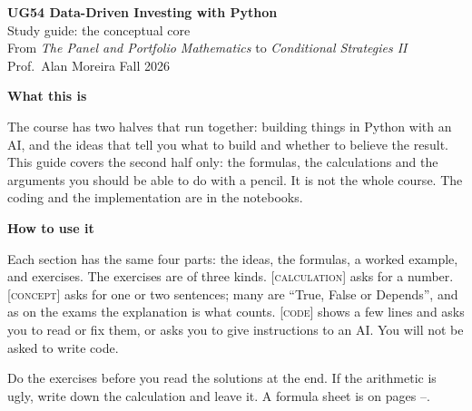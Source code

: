 \documentclass[11pt]{article}
\newcounter{ex}[section]
\newcommand{\head}[1]{\par\medskip\textbf{#1}\par}
\begin{document}
\begin{center}
{\LARGE\bfseries UG54 Data-Driven Investing with Python}\\[4pt]
{\Large Study guide: the conceptual core}\\[4pt]
{\normalsize From \emph{The Panel and Portfolio Mathematics} to \emph{Conditional Strategies II}}\\[2pt]
{\small Prof.\ Alan Moreira \quad Fall 2026}
\end{center}

\head{What this is}
The course has two halves that run together: building things in Python with an AI, and the ideas that tell you what to
build and whether to believe the result. This guide covers the second half only: the formulas, the calculations and
the arguments you should be able to do with a pencil. It is not the whole course. The coding and the implementation are
in the notebooks.

\head{How to use it}
Each section has the same four parts: the ideas, the formulas, a worked example, and exercises. The exercises are of
three kinds. \textsc{[calculation]} asks for a number. \textsc{[concept]} asks for one or two sentences; many are
``True, False or Depends'', and as on the exams the explanation is what counts. \textsc{[code]} shows a few lines and asks
you to read or fix them, or asks you to give instructions to an AI. You will not be asked to write code.

Do the exercises before you read the solutions at the end. If the arithmetic is ugly, write down the calculation and
leave it. A formula sheet is on pages \pageref{sec:sheet}--\pageref{sec:sheetend}.
\end{document}
